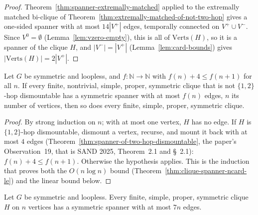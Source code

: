 \begin{proof}
  \leanok
  Theorem~\ref{thm:spanner-extremally-matched} applied to the extremally matched
  bi-clique of Theorem~\ref{thm:extremally-matched-of-not-two-hop} gives a
  one-sided spanner with at most $14|V^+|$ edges, temporally connected on
  $V^+ \cup V^-$. Since $V^0 = \emptyset$ (Lemma~\ref{lem:vzero-empty}), this
  is all of $\mathrm{Verts}(H)$, so it is a spanner of the clique $H$, and
  $|V^-| = |V^+|$ (Lemma~\ref{lem:card-bounds}) gives
  $|\mathrm{Verts}(H)| = 2|V^+|$.
\end{proof}

\begin{theorem}
  \label{thm:clique-induction}
  \leanok
  Let $G$ be symmetric and loopless, and $f : \mathbb{N} \to \mathbb{N}$ with
  $f(n) + 4 \le f(n + 1)$ for all $n$. If every finite, nontrivial,
  simple, proper, symmetric clique that is not $\{1,2\}$-hop dismountable has a
  symmetric spanner with at most $f(n)$ edges, $n$ its number of vertices,
  then so does every finite, simple, proper, symmetric clique.
\end{theorem}

\begin{proof}
  \leanok
  By strong induction on $n$; with at most one vertex, $H$ has no edge. If $H$
  is $\{1,2\}$-hop dismountable, dismount a vertex, recurse, and mount it back
  with at most $4$ edges (Theorem~\ref{thm:spanner-of-two-hop-dismountable},
  the paper's Observation~19, that is SAND 2025, Theorem~2.1 and \S~2.1):
  $f(n) + 4 \le f(n + 1)$. Otherwise the hypothesis applies. This is the
  induction that proves both the $O(n \log n)$ bound
  (Theorem~\ref{thm:clique-spanner-ncard-le}) and the linear bound below.
\end{proof}

\begin{theorem}
  \label{thm:clique-spanner-seven-mul}
  \leanok
  Let $G$ be symmetric and loopless. Every finite, simple, proper, symmetric
  clique $H$ on $n$ vertices has a symmetric spanner with at most $7n$ edges.
\end{theorem}

